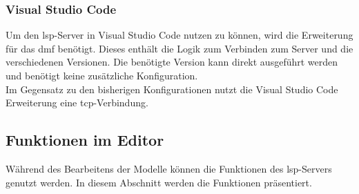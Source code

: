\documentclass[./einleitung.tex]{subfiles}
\begin{document}
    \subsubsection{Visual Studio Code}
    Um den \acrshort{lsp}-Server in Visual Studio Code nutzen zu können, wird die Erweiterung für das \acrshort{dmf} benötigt.
    Dieses enthält die Logik zum Verbinden zum Server und die verschiedenen Versionen.
    Die benötigte Version kann direkt ausgeführt werden und benötigt keine zusätzliche Konfiguration.\\
    Im Gegensatz zu den bisherigen Konfigurationen nutzt die Visual Studio Code Erweiterung eine \acrshort{tcp}-Verbindung.


    \subsection{Funktionen im Editor}
    Während des Bearbeitens der Modelle können die Funktionen des \acrshort{lsp}-Servers genutzt werden.
    In diesem Abschnitt werden die Funktionen präsentiert.
    
\end{document}
